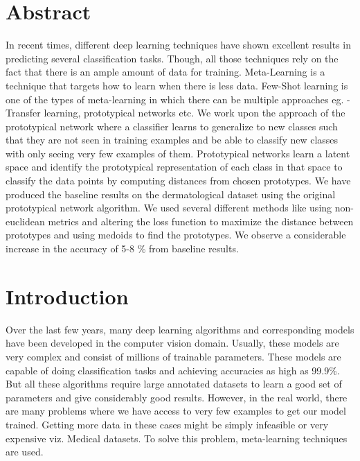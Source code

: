 \newpage

\section*{Abstract}
In recent times, different deep learning techniques have shown excellent results in predicting several classification tasks. Though, all those techniques rely on the fact that there is an ample amount of data for training. Meta-Learning is a technique that targets how to learn when there is less data. Few-Shot learning is one of the types of meta-learning in which there can be multiple approaches eg. - Transfer learning, prototypical networks etc. We work upon the approach of the prototypical network where a classifier learns to generalize to new classes such that they are not seen in training examples and be able to classify new classes with only seeing very few examples of them. Prototypical networks learn a latent space and identify the prototypical representation of each class in that space to classify the data points by computing distances from chosen prototypes. We have produced the baseline results on the dermatological dataset using the original prototypical network algorithm. We used several different methods like using non-euclidean metrics and altering the loss function to maximize the distance between prototypes and using medoids to find the prototypes. We observe a considerable increase in the accuracy of 5-8 \% from baseline results.
\newpage
\maketitle
\thispagestyle{empty}
\tableofcontents
\newpage
{}
\section{Introduction}
Over the last few years, many deep learning algorithms and corresponding models have been developed in the computer vision domain. Usually, these models are very complex and consist of millions of trainable parameters. These models are capable of doing classification tasks and achieving accuracies as high as 99.9\%. But all these algorithms require large annotated datasets to learn a good set of parameters and give considerably good results. However, in the real world, there are many problems where we have access to very few examples to get our model trained. Getting more data in these cases might be simply infeasible or very expensive viz. Medical datasets. To solve this problem, meta-learning techniques are used.

